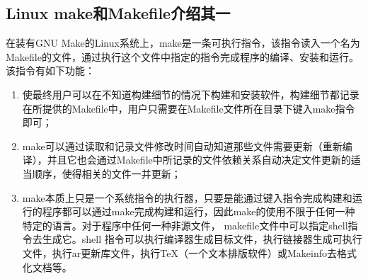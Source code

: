 \subsection{Linux make和Makefile介绍其一}\label{subsec:Makefile介绍}
在装有GNU Make的Linux系统上，make是一条可执行指令，该指令读入一个名为Makefile的文件，通过执行这个文件中指定的指令完成程序的编译、安装和运行。该指令有如下功能：
\begin{enumerate}
	\item 使最终用户可以在不知道构建细节的情况下构建和安装软件，构建细节都记录在所提供的Makefile中，用户只需要在Makefile文件所在目录下键入make指令即可；
	\item make可以通过读取和记录文件修改时间自动知道那些文件需要更新（重新编译），并且它也会通过Makefile中所记录的文件依赖关系自动决定文件更新的适当顺序，使得相关的文件一并更新；
	\item make本质上只是一个系统指令的执行器，只要是能通过键入指令完成构建和运行的程序都可以通过make完成构建和运行，因此make的使用不限于任何一种特定的语言。对于程序中任何一种非源文件， makefile文件中可以指定shell指令去生成它。shell 指令可以执行编译器生成目标文件，执行链接器生成可执行文件，执行ar更新库文件，执行TeX（一个文本排版软件）或Makeinfo去格式化文档等。
\end{enumerate}
